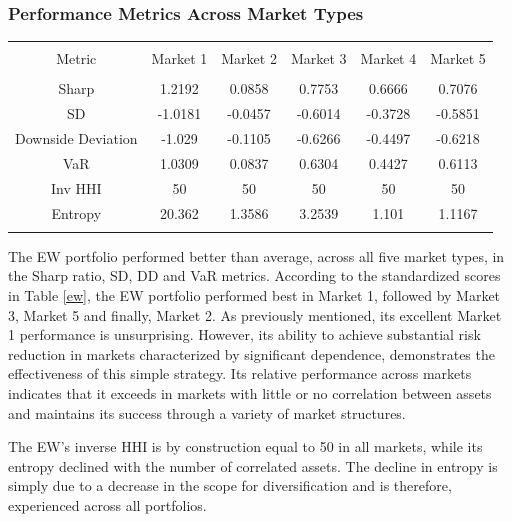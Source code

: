 \documentclass[11pt,preprint, authoryear]{elsarticle}
\let\origtable\table
\let\endorigtable\endtable
\renewenvironment{table}[1][2] {
    \expandafter\origtable\expandafter[H]
} {
    \endorigtable
}
\numberwithin{equation}{section}
\numberwithin{figure}{section}
\numberwithin{table}{section}
\begin{document}
\hypertarget{performance-metrics-across-market-types}{%
\subsubsection{\texorpdfstring{Performance Metrics Across Market Types
\label{perf}}{Performance Metrics Across Market Types }}\label{performance-metrics-across-market-types}}

\begin{table}[!htbp] \centering 
  \caption{Equal Weight} 
  \label{ew} 
\begin{tabular}{@{\extracolsep{5pt}} cccccc} 
\\[-1.8ex]\hline 
\hline \\[-1.8ex] 
Metric & Market 1 & Market 2 & Market 3 & Market 4 & Market 5 \\ 
\hline \\[-1.8ex] 
Sharp & 1.2192 & 0.0858 & 0.7753 & 0.6666 & 0.7076 \\ 
SD & -1.0181 & -0.0457 & -0.6014 & -0.3728 & -0.5851 \\ 
Downside Deviation & -1.029 & -0.1105 & -0.6266 & -0.4497 & -0.6218 \\ 
VaR & 1.0309 & 0.0837 & 0.6304 & 0.4427 & 0.6113 \\ 
Inv HHI & 50 & 50 & 50 & 50 & 50 \\ 
Entropy & 20.362 & 1.3586 & 3.2539 & 1.101 & 1.1167 \\ 
\hline \\[-1.8ex] 
\end{tabular} 
\end{table}

The EW portfolio performed better than average, across all five market
types, in the Sharp ratio, SD, DD and VaR metrics. According to the
standardized scores in Table \ref{ew}, the EW portfolio performed best
in Market 1, followed by Market 3, Market 5 and finally, Market 2. As
previously mentioned, its excellent Market 1 performance is
unsurprising. However, its ability to achieve substantial risk reduction
in markets characterized by significant dependence, demonstrates the
effectiveness of this simple strategy. Its relative performance across
markets indicates that it exceeds in markets with little or no
correlation between assets and maintains its success through a variety
of market structures.

The EW's inverse HHI is by construction equal to 50 in all markets,
while its entropy declined with the number of correlated assets. The
decline in entropy is simply due to a decrease in the scope for
diversification and is therefore, experienced across all portfolios.
\end{document}
